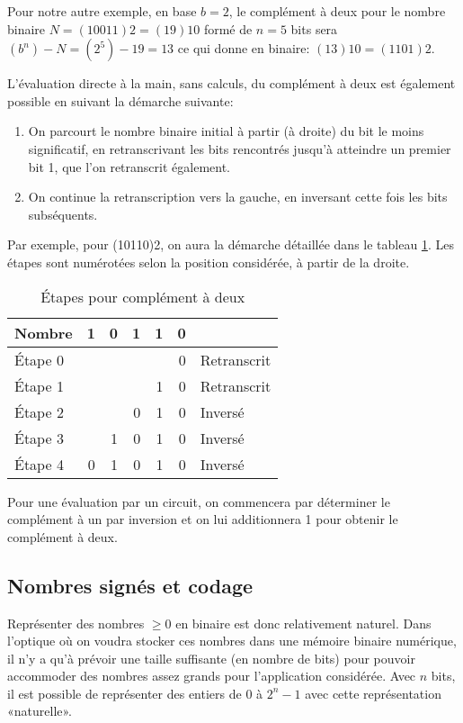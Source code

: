 \documentclass[11pt]{article}
\begin{document}
Pour notre autre exemple, en base \(b=2\), le complément à deux pour
le nombre binaire \(N = (10011)2 = (19)10\) formé de \(n=5\) bits
sera \((b^n)-N = (2^5) - 19 = 13\) ce qui donne en binaire:
\((13)10 = (1101)2\).

L'évaluation directe à la main, sans calculs, du complément à deux est
également possible en suivant la démarche suivante:
\begin{enumerate}
\item On parcourt le nombre binaire initial à partir (à droite) du bit le moins
significatif, en retranscrivant les bits rencontrés jusqu'à
atteindre un premier bit 1, que l'on retranscrit également.
\item On continue la retranscription vers la gauche, en inversant cette
fois les bits subséquents.
\end{enumerate}

Par exemple, pour (10110)2, on aura la démarche détaillée dans le
tableau \ref{tab:org094fe28}. Les étapes sont numérotées selon la position
considérée, à partir de la droite.

\begin{table}[htbp]
\caption{\label{tab:org094fe28}Étapes pour complément à deux}
\centering
\begin{tabular}{lrrrrrl}
Nombre & 1 & 0 & 1 & 1 & 0 & \\[0pt]
\hline
Étape 0 &  &  &  &  & 0 & Retranscrit\\[0pt]
Étape 1 &  &  &  & 1 & 0 & Retranscrit\\[0pt]
Étape 2 &  &  & 0 & 1 & 0 & Inversé\\[0pt]
Étape 3 &  & 1 & 0 & 1 & 0 & Inversé\\[0pt]
Étape 4 & 0 & 1 & 0 & 1 & 0 & Inversé\\[0pt]
\end{tabular}
\end{table}

Pour une évaluation par un circuit, on commencera par déterminer le
complément à un par inversion et on lui additionnera 1 pour obtenir le
complément à deux.

\subsection{Nombres signés et codage}
\label{sec:orgac94d29}

Représenter des nombres \(\geq 0\) en binaire est donc relativement
naturel. Dans l'optique où on voudra stocker ces nombres dans une
mémoire binaire numérique, il n'y a qu'à prévoir une taille suffisante
(en nombre de bits) pour pouvoir accommoder des nombres assez grands
pour l'application considérée. Avec \(n\) bits, il est possible de
représenter des entiers de \(0\) à \(2^n-1\) avec cette représentation
«naturelle».
\end{document}
